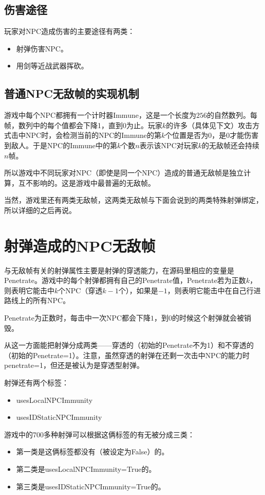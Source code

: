 \subsection{伤害途径}
玩家对NPC造成伤害的主要途径有两类：
\begin{itemize}
\item 射弹伤害NPC。
\item 用剑等近战武器挥砍。
\end{itemize}

\subsection{普通NPC无敌帧的实现机制}
游戏中每个NPC都拥有一个计时器Immune，这是一个长度为$256$的自然数列。每帧，数列中的每个值都会下降1，直到0为止。玩家$k$的许多（具体见下文）攻击方式击中NPC时，会检测当前的NPC的Immune的第$k$个位置是否为$0$，是$0$才能伤害到敌人。于是NPC的Immune中的第$k$个数$n$表示该NPC对玩家$k$的无敌帧还会持续$n$帧。

所以游戏中不同玩家对NPC（即使是同一个NPC）造成的普通无敌帧是独立计算，互不影响的。这是游戏中最普遍的无敌帧。

当然，游戏里还有两类无敌帧，这两类无敌帧与下面会说到的两类特殊射弹绑定，所以详细的之后再说。

\section{射弹造成的NPC无敌帧}
与无敌帧有关的射弹属性主要是射弹的穿透能力，在源码里相应的变量是Penetrate。游戏中的每个射弹都拥有自己的Penetrate值，Penetrate若为正数$k$，则表明它能击中$k$个NPC（穿透$k-1$个），如果是$-1$，则表明它能击中在自己行进路线上的所有NPC。

Penetrate为正数时，每击中一次NPC都会下降$1$，到$0$的时候这个射弹就会被销毁。

从这一方面能把射弹分成两类——穿透的（初始的Penetrate不为1）和不穿透的（初始的Penetrate=1）。注意，虽然穿透的射弹在还剩一次击中NPC的能力时penetrate=1，但还是被认为是穿透型射弹。

射弹还有两个标签：
\begin{itemize}
\item usesLocalNPCImmunity
\item usesIDStaticNPCImmunity
\end{itemize}

游戏中的700多种射弹可以根据这俩标签的有无被分成三类：
\begin{itemize}
\item 第一类是这俩标签都没有（被设定为False）的。
\item 第二类是usesLocalNPCImmunity=True的。
\item 第三类是usesIDStaticNPCImmunity=True的。
\end{itemize}

